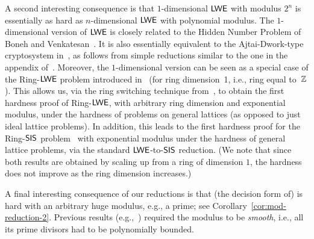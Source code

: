 A second interesting consequence is that $1$-dimensional $\mathsf{LWE}$ with
modulus $2^n$ is essentially as hard as $n$-dimensional $\mathsf{LWE}$ with
polynomial modulus. The $1$-dimensional version of $\mathsf{LWE}$ is closely
related to the Hidden Number Problem of Boneh and
Venkatesan~\cite{DBLP:conf/crypto/BonehV96}. It is also essentially equivalent to the
Ajtai-Dwork-type~\cite{DBLP:conf/stoc/AjtaiD97} cryptosystem in~\cite{DBLP:journals/jacm/Regev04}, as follows from simple reductions
similar to the one in the appendix of~\cite{RegevSurvey}.
Moreover, the $1$-dimensional version can be seen as a special case of
the Ring-$\mathsf{LWE}$ problem introduced
in~\cite{DBLP:conf/eurocrypt/LyubashevskyPR10} (for ring dimension~1,
i.e., ring equal to~$\mathbb{Z}$). This allows us, via the ring switching
technique from~\cite{DBLP:conf/scn/GentryHPS12}, to obtain the first
hardness proof of Ring-$\mathsf{LWE}$, with arbitrary ring dimension and
exponential modulus, under the hardness of problems on general lattices (as
opposed to just ideal lattice problems). In addition, this leads to the
first hardness proof for the Ring-$\mathsf{SIS}$
problem~\cite{DBLP:conf/icalp/LyubashevskyM06,DBLP:conf/tcc/PeikertR06}
with exponential modulus under the hardness of general lattice problems, via the standard
$\mathsf{LWE}$-to-$\mathsf{SIS}$ reduction. (We note that since both results are obtained by
scaling up from a ring of dimension $1$, the hardness does not improve
as the ring dimension increases.)

A final interesting consequence of our reductions is that (the
decision form of) \lwe is hard with an arbitrary huge modulus, e.g., a
prime; see Corollary~\ref{cor:mod-reduction-2}.  Previous results
(e.g.,~\cite{DBLP:journals/jacm/Regev09,DBLP:conf/stoc/Peikert09,DBLP:conf/crypto/MicciancioM11,DBLP:conf/eurocrypt/MicciancioP12})
required the modulus to be \emph{smooth}, i.e., all its prime divisors
had to be polynomially bounded.



